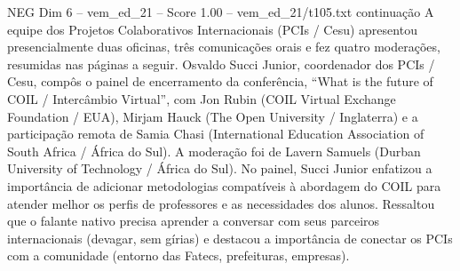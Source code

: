 \begin{textsample}{NEG Dim 6 – vem\_ed\_21 – Score 1.00 – vem\_ed\_21/t105.txt}  \label{ex:f6_neg_039}
continuação A equipe dos Projetos Colaborativos Internacionais (PCIs / Cesu) apresentou presencialmente duas oficinas, três comunicações orais e fez quatro moderações, resumidas nas páginas a seguir.
Osvaldo Succi Junior, coordenador dos PCIs / Cesu, compôs o painel de encerramento da conferência, “What is the future of COIL / Intercâmbio Virtual”, com Jon Rubin (COIL Virtual Exchange Foundation / EUA), Mirjam Hauck (The Open University / Inglaterra) e a participação remota de Samia Chasi (International Education Association of South Africa / África do Sul).
A moderação foi de Lavern Samuels (Durban University of Technology / África do Sul).
No painel, Succi Junior enfatizou a importância de adicionar metodologias compatíveis à abordagem do COIL para atender melhor os perfis de professores e as necessidades dos alunos.
Ressaltou que o falante nativo precisa aprender a conversar com seus parceiros internacionais (devagar, sem gírias) e destacou a importância de conectar os PCIs com a comunidade (entorno das Fatecs, prefeituras, empresas).

\end{textsample}
